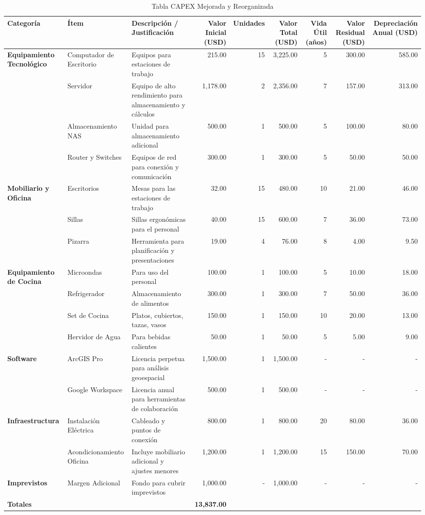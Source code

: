 \begin{table}[H]
	\centering
	\begin{tabular}{|l|l|p{8cm}|r|r|r|r|r|r|}
	\hline
	\textbf{Categor\'ia} & \textbf{\'Item} & \textbf{Descripci\'on / Justificaci\'on} & \textbf{Valor Inicial (USD)} & \textbf{Unidades} & \textbf{Valor Total (USD)} & \textbf{Vida \'Util (a\~nos)} & \textbf{Valor Residual (USD)} & \textbf{Depreciaci\'on Anual (USD)} \\
	\hline
	\textbf{Equipamiento Tecnol\'ogico} & Computador de Escritorio & Equipos para estaciones de trabajo & 215.00 & 15 & 3,225.00 & 5 & 300.00 & 585.00 \\
	\hline
	 & Servidor & Equipo de alto rendimiento para almacenamiento y c\'alculos & 1,178.00 & 2 & 2,356.00 & 7 & 157.00 & 313.00 \\
	\hline
	 & Almacenamiento NAS & Unidad para almacenamiento adicional & 500.00 & 1 & 500.00 & 5 & 100.00 & 80.00 \\
	\hline
	 & Router y Switches & Equipos de red para conexi\'on y comunicaci\'on & 300.00 & 1 & 300.00 & 5 & 50.00 & 50.00 \\
	\hline
	\textbf{Mobiliario y Oficina} & Escritorios & Mesas para las estaciones de trabajo & 32.00 & 15 & 480.00 & 10 & 21.00 & 46.00 \\
	\hline
	 & Sillas & Sillas ergon\'omicas para el personal & 40.00 & 15 & 600.00 & 7 & 36.00 & 73.00 \\
	\hline
	 & Pizarra & Herramienta para planificaci\'on y presentaciones & 19.00 & 4 & 76.00 & 8 & 4.00 & 9.50 \\
	\hline
	\textbf{Equipamiento de Cocina} & Microondas & Para uso del personal & 100.00 & 1 & 100.00 & 5 & 10.00 & 18.00 \\
	\hline
	 & Refrigerador & Almacenamiento de alimentos & 300.00 & 1 & 300.00 & 7 & 50.00 & 36.00 \\
	\hline
	 & Set de Cocina & Platos, cubiertos, tazas, vasos & 150.00 & 1 & 150.00 & 10 & 20.00 & 13.00 \\
	\hline
	 & Hervidor de Agua & Para bebidas calientes & 50.00 & 1 & 50.00 & 5 & 5.00 & 9.00 \\
	\hline
	\textbf{Software} & ArcGIS Pro & Licencia perpetua para an\'alisis geoespacial & 1,500.00 & 1 & 1,500.00 & - & - & - \\
	\hline
	 & Google Workspace & Licencia anual para herramientas de colaboraci\'on & 500.00 & 1 & 500.00 & - & - & - \\
	\hline
	\textbf{Infraestructura} & Instalaci\'on El\'ectrica & Cableado y puntos de conexi\'on & 800.00 & 1 & 800.00 & 20 & 80.00 & 36.00 \\
	\hline
	 & Acondicionamiento Oficina & Incluye mobiliario adicional y ajustes menores & 1,200.00 & 1 & 1,200.00 & 15 & 150.00 & 70.00 \\
	\hline
	\textbf{Imprevistos} & Margen Adicional & Fondo para cubrir imprevistos & 1,000.00 & - & 1,000.00 & - & - & - \\
	\hline
	\textbf{Totales} & & & \textbf{13,837.00} & & & & & \\
	\hline
	\end{tabular}
	\caption{Tabla CAPEX Mejorada y Reorganizada}
	\label{tab:capex_mejorada}
	\end{table}